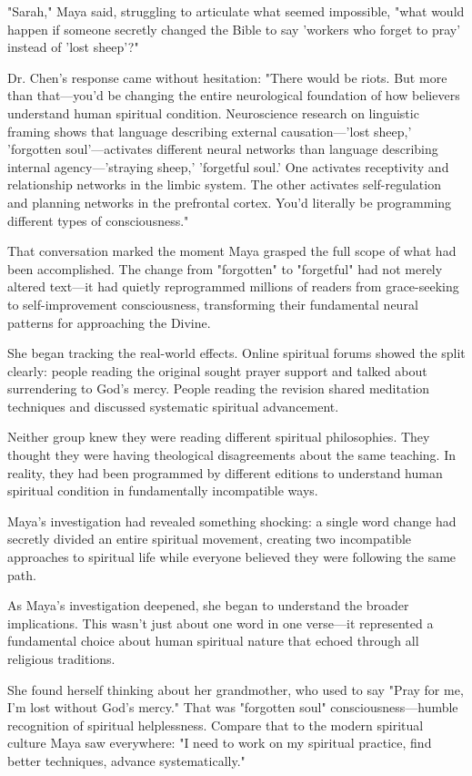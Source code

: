 \documentclass[12pt,twoside]{book}
\begin{document}
"Sarah," Maya said, struggling to articulate what seemed impossible, "what would happen if someone secretly changed the Bible to say 'workers who forget to pray' instead of 'lost sheep'?"

Dr. Chen's response came without hesitation: "There would be riots. But more than that—you'd be changing the entire neurological foundation of how believers understand human spiritual condition. Neuroscience research on linguistic framing shows that language describing external causation—'lost sheep,' 'forgotten soul'—activates different neural networks than language describing internal agency—'straying sheep,' 'forgetful soul.' One activates receptivity and relationship networks in the limbic system. The other activates self-regulation and planning networks in the prefrontal cortex. You'd literally be programming different types of consciousness."

That conversation marked the moment Maya grasped the full scope of what had been accomplished. The change from "forgotten" to "forgetful" had not merely altered text—it had quietly reprogrammed millions of readers from grace-seeking to self-improvement consciousness, transforming their fundamental neural patterns for approaching the Divine.

She began tracking the real-world effects. Online spiritual forums showed the split clearly: people reading the original sought prayer support and talked about surrendering to God's mercy. People reading the revision shared meditation techniques and discussed systematic spiritual advancement.

Neither group knew they were reading different spiritual philosophies. They thought they were having theological disagreements about the same teaching. In reality, they had been programmed by different editions to understand human spiritual condition in fundamentally incompatible ways.

Maya's investigation had revealed something shocking: a single word change had secretly divided an entire spiritual movement, creating two incompatible approaches to spiritual life while everyone believed they were following the same path.

As Maya's investigation deepened, she began to understand the broader implications. This wasn't just about one word in one verse—it represented a fundamental choice about human spiritual nature that echoed through all religious traditions.

She found herself thinking about her grandmother, who used to say "Pray for me, I'm lost without God's mercy." That was "forgotten soul" consciousness—humble recognition of spiritual helplessness. Compare that to the modern spiritual culture Maya saw everywhere: "I need to work on my spiritual practice, find better techniques, advance systematically."
\end{document}
